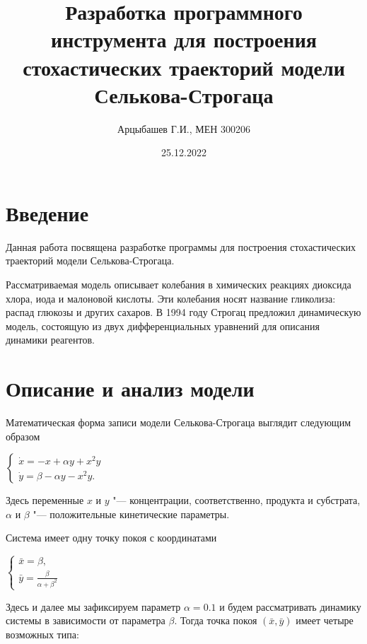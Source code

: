 \documentclass[a4paper, 14pt]{article}
\title{Разработка программного инструмента для построения стохастических траекторий модели Селькова-Строгаца}
\author{Арцыбашев Г.И., МЕН 300206}
\date{25.12.2022}
\begin{document}
	
	\maketitle
	\newpage
	\tableofcontents
	\newpage
	
	\section{Введение}
		
		
		Данная работа посвящена разработке программы для построения стохастических траекторий модели Селькова-Строгаца.
		
		Рассматриваемая модель описывает колебания в химических реакциях диоксида хлора, иода и малоновой кислоты. Эти колебания носят название гликолиза: распад глюкозы и других сахаров. В 1994 году Строгац предложил динамическую модель, состоящую из двух дифференциальных уравнений для описания динамики реагентов.
	
	
	\section{Описание и анализ модели}
		
		
		Математическая форма записи модели Селькова-Строгаца выглядит следующим образом
		\begin{center}
			\begin{math}
				\begin{cases}
					\dot x = -x + \alpha y + x^2y \\
					\dot y = \beta - \alpha y - x^2y.
				\end{cases} 
			\end{math}
		\end{center}
		
		Здесь переменные $x$ и $y$ "--- концентрации, соответственно, продукта и субстрата, $\alpha$ и $\beta$ "--- положительные кинетические параметры.
		
		Система имеет одну точку покоя с координатами
		\begin{center}
			\begin{math}
				\begin{cases}
					\bar x = \beta, \\
					\bar y = \frac{\beta}{\alpha + \beta^2}
				\end{cases}
			\end{math}
		\end{center}
		
		Здесь и далее мы зафиксируем параметр $\alpha = 0.1$ и будем рассматривать динамику системы в зависимости от параметра $\beta$. Тогда точка покоя $(\bar{x}, \bar{y})$ имеет четыре возможных типа:
		
\end{document}
